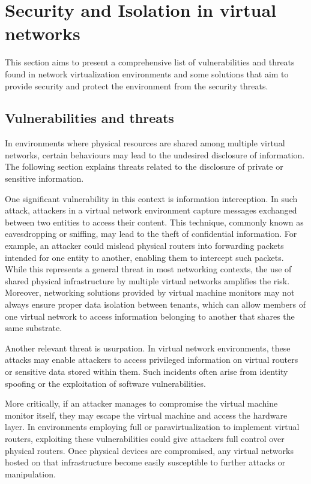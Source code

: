 \section{Security and Isolation in virtual networks}

This section aims to present a comprehensive list of vulnerabilities and threats found in network virtualization environments and some solutions that aim to provide security and protect the environment from the security threats.

\subsection{Vulnerabilities and threats}

In environments where physical resources are shared among multiple virtual networks, certain behaviours may lead to the undesired disclosure of information. The following section explains threats related to the disclosure of private or sensitive information.

One significant vulnerability in this context is information interception. In such attack, attackers in a virtual network environment capture messages exchanged between two entities to access their content. This technique, commonly known as eavesdropping or sniffing, may lead to the theft of confidential information. For example, an attacker could mislead physical routers into forwarding packets intended for one entity to another, enabling them to intercept such packets. While this represents a general threat in most networking contexts, the use of shared physical infrastructure by multiple virtual networks amplifies the risk. Moreover, networking solutions provided by virtual machine monitors may not always ensure proper data isolation between tenants, which can allow members of one virtual network to access information belonging to another that shares the same substrate.

Another relevant threat is usurpation. In virtual network environments, these attacks may enable attackers to access privileged information on virtual routers or sensitive data stored within them. Such incidents often arise from identity spoofing or the exploitation of software vulnerabilities.

More critically, if an attacker manages to compromise the virtual machine monitor itself, they may escape the virtual machine and access the hardware layer. In environments employing full or paravirtualization to implement virtual routers, exploiting these vulnerabilities could give attackers full control over physical routers. Once physical devices are compromised, any virtual networks hosted on that infrastructure become easily susceptible to further attacks or manipulation.

